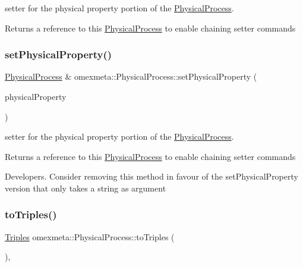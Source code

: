 setter for the physical property portion of the \hyperlink{classomexmeta_1_1PhysicalProcess}{Physical\+Process}. 

\begin{DoxyReturn}{Returns}
a reference to this \hyperlink{classomexmeta_1_1PhysicalProcess}{Physical\+Process} to enable chaining setter commands 
\end{DoxyReturn}
\mbox{\label{classomexmeta_1_1PhysicalProcess_ac49bf4a1c21c6590a9d2af7ae93e13a7}} 
\subsubsection{\texorpdfstring{set\+Physical\+Property()}{setPhysicalProperty()}\hspace{0.1cm}{\footnotesize\ttfamily [2/2]}}
{\footnotesize\ttfamily \hyperlink{classomexmeta_1_1PhysicalProcess}{Physical\+Process} \& omexmeta\+::\+Physical\+Process\+::set\+Physical\+Property (\begin{DoxyParamCaption}\item[{\hyperlink{classomexmeta_1_1PhysicalProperty}{Physical\+Property}}]{physical\+Property }\end{DoxyParamCaption})}



setter for the physical property portion of the \hyperlink{classomexmeta_1_1PhysicalProcess}{Physical\+Process}. 

\begin{DoxyReturn}{Returns}
a reference to this \hyperlink{classomexmeta_1_1PhysicalProcess}{Physical\+Process} to enable chaining setter commands
\end{DoxyReturn}
Developers. Consider removing this method in favour of the set\+Physical\+Property version that only takes a string as argument \mbox{\label{classomexmeta_1_1PhysicalProcess_ab6f6af00fac2401f9a88e186fd1d897a}} 
\subsubsection{\texorpdfstring{to\+Triples()}{toTriples()}}
{\footnotesize\ttfamily \hyperlink{classomexmeta_1_1Triples}{Triples} omexmeta\+::\+Physical\+Process\+::to\+Triples (\begin{DoxyParamCaption}{ }\end{DoxyParamCaption})\hspace{0.3cm}{\ttfamily [override]}, {\ttfamily [virtual]}}



